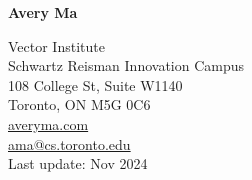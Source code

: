 \documentclass[11pt,letterpaper]{article}
\begin{document}
\raggedright

  {\bfseries\Huge{Avery Ma}}
  \vspace{10pt}

  {\small
    Vector Institute\\
    Schwartz Reisman Innovation Campus\\
    108 College St, Suite W1140\\
    Toronto, ON M5G 0C6\\
    \vspace{-1pt}
    \href{http://averyma.com}{averyma.com}\\
    \vspace{-2pt}
    \href{mailto:ama@cs.toronto.edu}{ama@cs.toronto.edu}
    \vspace{-3pt}\\
    Last update: Nov 2024
  }
  

\end{document}
